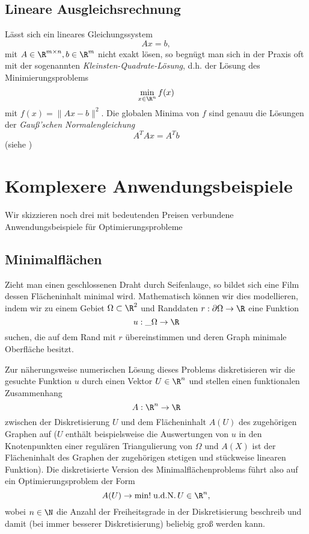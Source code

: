 \subsection{Lineare Ausgleichsrechnung}

Lässt sich ein lineares Gleichungssystem
\[
	Ax = b,
\]
mit $A \in \R^{m\times n}, b\in \R^m$ nicht exakt lösen, so begnügt man sich in der Praxis oft mit der sogenannten \emph{Kleinsten-Quadrate-Lösung}, d.h. der Lösung des Minimierungsproblems
\[
	\min_{x\in\R^n} f(x)
\]
mit $f(x) = \|Ax-b\|^2$.
Die globalen Minima von $f$ sind genauu die Lösungen der \emph{Gauß'schen Normalengleichung}
\[
	A^T Ax = A^T b
\]
(siehe )


\section{Komplexere Anwendungsbeispiele}


Wir skizzieren noch drei mit bedeutenden Preisen verbundene Anwendungsbeispiele für Optimierungsprobleme

\subsection{Minimalflächen}

Zieht man einen geschlossenen Draht durch Seifenlauge, so bildet sich eine Film dessen Flächeninhalt minimal wird.
Mathematisch können wir dies modellieren, indem wir zu einem Gebiet $\Omega \subset \R^2$ und Randdaten $r: \partial \Omega \to \R$ eine Funktion
\[
	u: \_{\Omega} \to \R
\]
suchen, die auf dem Rand mit $r$ übereinstimmen und deren Graph minimale Oberfläche besitzt.

Zur näherungsweise numerischen Lösung dieses Problems diskretisieren wir die gesuchte Funktion $u$ durch einen Vektor $U \in \R^n$ und stellen einen funktionalen Zusammenhang
\[
	A: \R^n \to \R
\]
zwischen der Diskretisierung $U$ und dem Flächeninhalt $A(U)$ des zugehörigen Graphen auf
($U$ enthält beispielsweise die Auswertungen von $u$ in den Knotenpunkten einer regulären Triangulierung von $\Omega$ und $A(X)$ ist der Flächeninhalt des Graphen der zugehörigen stetigen und stückweise linearen Funktion).
Die diskretisierte Version des Minimalflächenproblems führt also auf ein Optimierungsproblem der Form
\[
	A(U) \to \min!
	\udN
	U \in \R^n,
\]
wobei $n \in \N$ die Anzahl der Freiheitsgrade in der Diskretisierung beschreib und damit (bei immer besserer Diskretisierung) beliebig groß werden kann.


